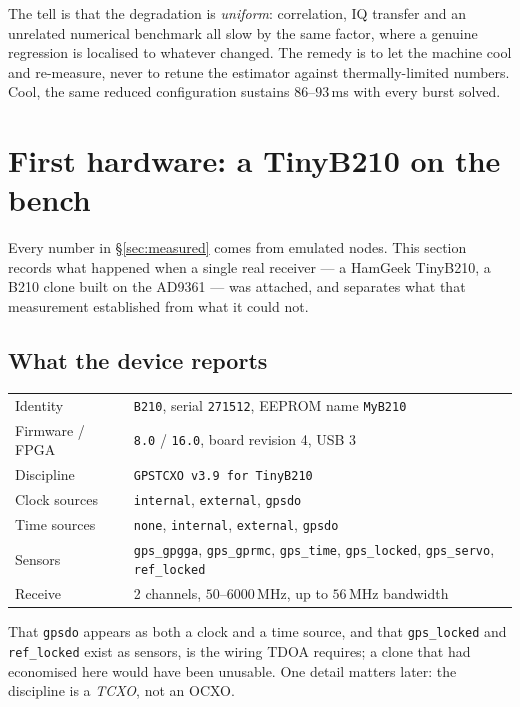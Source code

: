 \documentclass[11pt,a4paper]{article}
\newcommand{\code}[1]{\texttt{\small #1}}
\begin{document}
The tell is that the degradation is \emph{uniform}: correlation, IQ
transfer and an unrelated numerical benchmark all slow by the same factor,
where a genuine regression is localised to whatever changed. The remedy is
to let the machine cool and re-measure, never to retune the estimator
against thermally-limited numbers. Cool, the same reduced configuration
sustains $86$--$93$\,ms with every burst solved.

\section{First hardware: a TinyB210 on the bench}
\label{sec:hw}

Every number in \S\ref{sec:measured} comes from emulated nodes. This section
records what happened when a single real receiver --- a HamGeek TinyB210, a
B210 clone built on the AD9361 --- was attached, and separates what that
measurement established from what it could not.

\subsection{What the device reports}

\begin{center}
\small
\begin{tabular}{@{}ll@{}}
\toprule
Identity & \code{B210}, serial \code{271512}, EEPROM name \code{MyB210} \\
Firmware / FPGA & \code{8.0} / \code{16.0}, board revision 4, USB 3 \\
Discipline & \code{GPSTCXO v3.9 for TinyB210} \\
Clock sources & \code{internal}, \code{external}, \code{gpsdo} \\
Time sources & \code{none}, \code{internal}, \code{external}, \code{gpsdo} \\
Sensors & \code{gps\_gpgga}, \code{gps\_gprmc}, \code{gps\_time},
           \code{gps\_locked}, \code{gps\_servo}, \code{ref\_locked} \\
Receive & 2 channels, $50$--$6000$\,MHz, up to $56$\,MHz bandwidth \\
\bottomrule
\end{tabular}
\end{center}

That \code{gpsdo} appears as both a clock and a time source, and that
\code{gps\_locked} and \code{ref\_locked} exist as sensors, is the wiring TDOA
requires; a clone that had economised here would have been unusable. One detail
matters later: the discipline is a \emph{TCXO}, not an OCXO.
\end{document}
